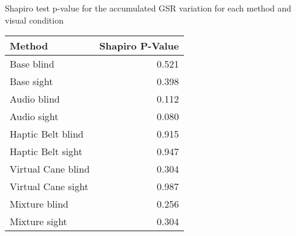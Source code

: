 
\centering
\caption{Shapiro test p-value for the accumulated GSR variation for each method and visual condition}
\label{tab:shapiro_gsr_sum}
\begin{tabular}{lr}
\toprule
            Method &  Shapiro P-Value \\
\midrule
        Base blind &            0.521 \\
        Base sight &            0.398 \\
       Audio blind &            0.112 \\
       Audio sight &            0.080 \\
 Haptic Belt blind &            0.915 \\
 Haptic Belt sight &            0.947 \\
Virtual Cane blind &            0.304 \\
Virtual Cane sight &            0.987 \\
     Mixture blind &            0.256 \\
     Mixture sight &            0.304 \\
\bottomrule
\end{tabular}
